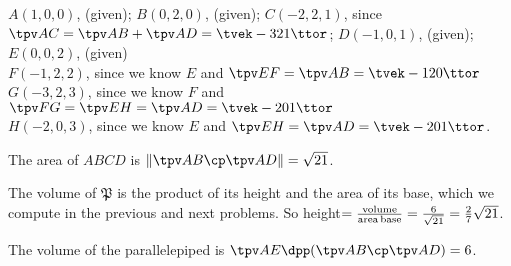 $A(1,0,0)$, (given);
$B(0,2,0)$, (given);
$C(-2,2,1)$, since $\tpv AC = \tpv AB + \tpv AD = \tvek-3\\2\\1\ttor$;
$D(-1,0,1)$, (given);
$E(0,0,2)$, (given)\\
$F(-1,2,2)$, since we know $E$ and  $\tpv EF = \tpv AB = \tvek -1\\2\\0\ttor$\\
$G(-3,2,3)$, since we know $F$ and  $\tpv FG =\tpv EH = \tpv AD = \tvek -2\\0\\1\ttor$\\
$H(-2,0,3)$, since we know $E$ and  $\tpv EH = \tpv AD = \tvek -2\\0\\1\ttor$.
\bigskip

\item[{\bfseries(VI13.8b)}]

The area of $ABCD$ is $\| \tpv AB\cp\tpv AD\| = \sqrt{21}$.
\bigskip

\item[{\bfseries(VI13.8c)}]

The volume of $\mathfrak P$ is the product of its height and the area of its
base, which we compute in the previous and next problems.  So
height$=\frac{\rm volume}{\rm area\, base} = \frac{6}{\sqrt{21}} =
\frac{2}{7}\sqrt{21}$.
\bigskip

\item[{\bfseries(VI13.8d)}]

The volume of the parallelepiped is $\tpv AE\dpp(\tpv AB \cp \tpv AD) = 6$.
\bigskip
